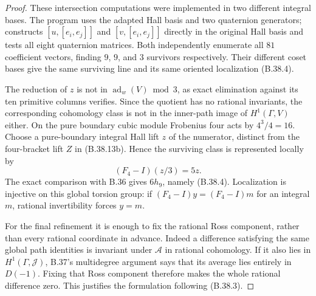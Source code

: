 \begin{proof}
These intersection computations were implemented in
two different integral bases. The program
 uses the
adapted Hall basis and two quaternion generators;
 constructs
$[u,[e_i,e_j]]$ and $[v,[e_i,e_j]]$ directly in the
original Hall basis and tests all eight quaternion
matrices. Both independently enumerate all $81$
coefficient vectors, finding $9$, $9$, and $3$
survivors respectively. Their different coset bases
give the same surviving line and its same oriented
localization (B.38.4).

The reduction of $z$ is not in
$\operatorname{ad}_w(V)\bmod3$, as exact elimination
against its ten primitive columns verifies.
Since the quotient has no rational invariants,
the corresponding cohomology class is not in the
inner-path image of $H^1(\Gamma,V)$ either.
On the pure boundary cubic module Frobenius four
acts by $4^3/4=16$. Choose a pure-boundary integral
Hall lift $z$ of the numerator, distinct from the
four-bracket lift $Z$ in (B.38.13b).
Hence the surviving class is
represented locally by
\[
                        (F_4-I)(z/3)=5z.                    \tag{B.38.14}
\]
The exact comparison with B.36 gives $6h_9$, namely
(B.38.4). Localization is injective on this global
torsion group: if $(F_4-I)y=(F_4-I)m$ for an integral
$m$, rational invertibility forces $y=m$.

For the final refinement it is enough to fix the
rational Ross component, rather than every rational
coordinate in advance. Indeed a difference satisfying
the same global path identities is invariant under
$\mathcal A$ in rational cohomology.
If it also lies in $H^1(\Gamma,\mathcal J)$, B.37's
multidegree argument says that its average lies
entirely in $D(-1)$. Fixing that Ross component
therefore makes the whole rational difference zero.
This justifies the formulation following (B.38.3).


\end{proof}
